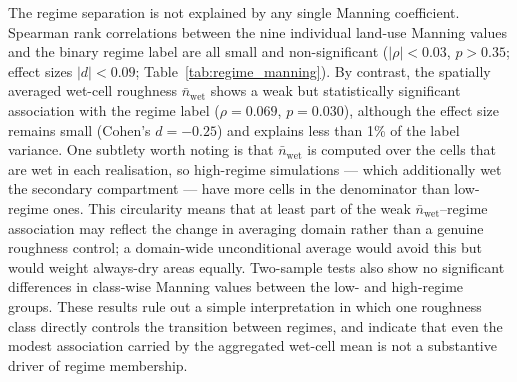 \documentclass[a4paper,fleqn]{cas-sc}
\begin{document}
The regime separation is not explained by any single Manning coefficient. Spearman rank correlations between the nine individual land-use Manning values and the binary regime label are all small and non-significant ($|\rho|<0.03$, $p>0.35$; effect sizes $|d|<0.09$; Table~\ref{tab:regime_manning}). By contrast, the spatially averaged wet-cell roughness $\bar{n}_{\mathrm{wet}}$ shows a weak but statistically significant association with the regime label ($\rho=0.069$, $p=0.030$), although the effect size remains small (Cohen's $d=-0.25$) and explains less than 1\% of the label variance. One subtlety worth noting is that $\bar{n}_{\mathrm{wet}}$ is computed over the cells that are wet in each realisation, so high-regime simulations --- which additionally wet the secondary compartment --- have more cells in the denominator than low-regime ones. This circularity means that at least part of the weak $\bar{n}_{\mathrm{wet}}$--regime association may reflect the change in averaging domain rather than a genuine roughness control; a domain-wide unconditional average would avoid this but would weight always-dry areas equally. Two-sample tests also show no significant differences in class-wise Manning values between the low- and high-regime groups. These results rule out a simple interpretation in which one roughness class directly controls the transition between regimes, and indicate that even the modest association carried by the aggregated wet-cell mean is not a substantive driver of regime membership.
\end{document}
